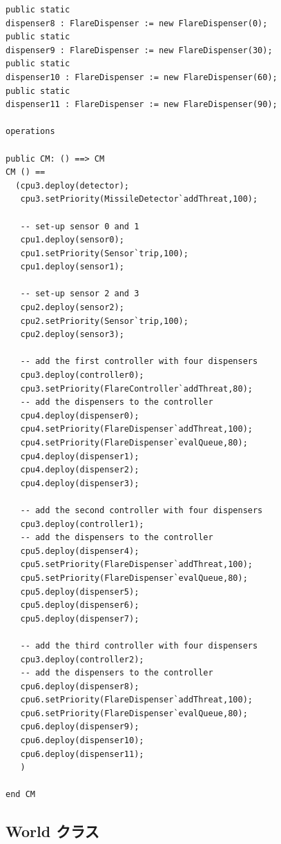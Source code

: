 \documentclass[\pformat,12pt]{jreport}
\begin{document}
\begin{lstlisting}
public static 
dispenser8 : FlareDispenser := new FlareDispenser(0);
public static 
dispenser9 : FlareDispenser := new FlareDispenser(30);
public static 
dispenser10 : FlareDispenser := new FlareDispenser(60);
public static 
dispenser11 : FlareDispenser := new FlareDispenser(90);
  
operations

public CM: () ==> CM
CM () ==
  (cpu3.deploy(detector);
   cpu3.setPriority(MissileDetector`addThreat,100);

   -- set-up sensor 0 and 1
   cpu1.deploy(sensor0);
   cpu1.setPriority(Sensor`trip,100);
   cpu1.deploy(sensor1);

   -- set-up sensor 2 and 3
   cpu2.deploy(sensor2);
   cpu2.setPriority(Sensor`trip,100);
   cpu2.deploy(sensor3);

   -- add the first controller with four dispensers
   cpu3.deploy(controller0);
   cpu3.setPriority(FlareController`addThreat,80);
   -- add the dispensers to the controller
   cpu4.deploy(dispenser0);
   cpu4.setPriority(FlareDispenser`addThreat,100);
   cpu4.setPriority(FlareDispenser`evalQueue,80);
   cpu4.deploy(dispenser1);
   cpu4.deploy(dispenser2);
   cpu4.deploy(dispenser3);

   -- add the second controller with four dispensers
   cpu3.deploy(controller1);
   -- add the dispensers to the controller
   cpu5.deploy(dispenser4);
   cpu5.setPriority(FlareDispenser`addThreat,100);
   cpu5.setPriority(FlareDispenser`evalQueue,80);
   cpu5.deploy(dispenser5);
   cpu5.deploy(dispenser6);
   cpu5.deploy(dispenser7);

   -- add the third controller with four dispensers
   cpu3.deploy(controller2);
   -- add the dispensers to the controller
   cpu6.deploy(dispenser8);
   cpu6.setPriority(FlareDispenser`addThreat,100);
   cpu6.setPriority(FlareDispenser`evalQueue,80);
   cpu6.deploy(dispenser9);
   cpu6.deploy(dispenser10);
   cpu6.deploy(dispenser11);
   )

end CM
\end{lstlisting}

\subsection{World クラス}
\end{document}
